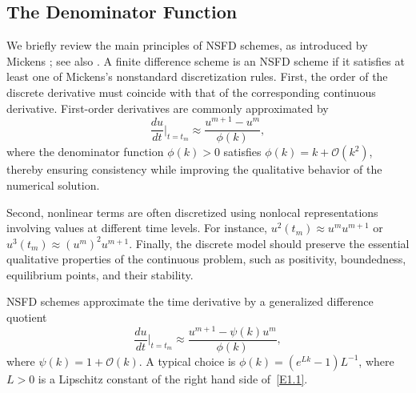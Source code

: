 \documentclass[final,12pt,3p]{elsarticle}
\theoremstyle{plain}
\theoremstyle{definition}
\theoremstyle{remark}
\newtheorem{remark}{Remark}
\begin{document}
\subsection{The Denominator Function}\label{S2.1}

We briefly review the main principles of NSFD schemes, as introduced by Mickens \cite{Mickens1999}; see also \cite[p.~6]{Zinihi2025NSFD}. 
A finite difference scheme is an NSFD scheme if it satisfies at least one of Mickens's nonstandard discretization rules.
%
First, the order of the discrete derivative must coincide with that of the corresponding continuous derivative. First-order derivatives are commonly approximated by
\begin{equation*}
    \frac{d u}{dt}\Big|_{t=t_m} \approx \frac{u^{m+1}-u^m}{\phi(k)},
\end{equation*}
where the denominator function $\phi(k)>0$ satisfies $\phi(k)=k+\mathcal{O}(k^2)$, thereby ensuring consistency while improving the qualitative behavior of the numerical solution.

Second, nonlinear terms are often discretized using nonlocal representations involving values at different time levels. For instance, $u^2(t_m)\approx u^m u^{m+1}$ or $u^3(t_m)\approx (u^m)^2u^{m+1}$.
%
Finally, the discrete model should preserve the essential qualitative properties of the continuous problem, such as positivity, boundedness, equilibrium points, and their stability.

NSFD schemes approximate the time derivative by a generalized difference quotient
\begin{equation*}
\frac{d u}{dt}\Big|_{t=t_m} \approx \frac{u^{m+1}-\psi(k)u^m}{\phi(k)},
\end{equation*}
where $\psi(k)=1+\mathcal{O}(k)$. A typical choice is $\phi(k)=(e^{Lk}-1)L^{-1}$, where $L>0$ is a Lipschitz constant of the right hand side of~\eqref{E1.1}.

\end{document}
